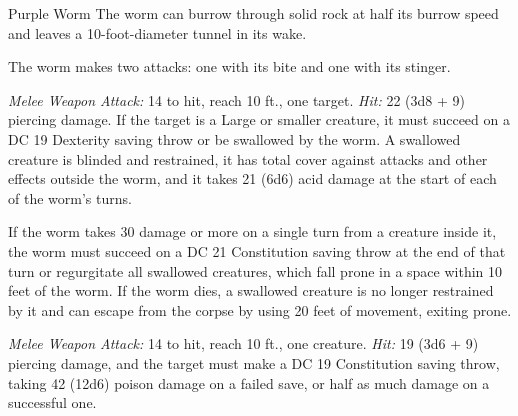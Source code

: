 \documentclass[10pt,a4paper,twoside,bg=print,twocolumn,openany,nodeprecatedcode]{dndbook}
\begin{document}
\begin{DndMonster}[float=t]{Purple Worm}
\DndMonsterBasics[
armor-class = {18 (natural armor)},
hit-points = {\DndDice{15d20 + 90}},
speed = {50 ft., burrow 30 ft.}
]
\DndMonsterAbilityScores[
 str = 28,
 dex = 7,
 con = 22,
 int = 1,
 wis = 8,
 cha = 4
]
\DndMonsterDetails[
saving-throws = {Con +11, Wis +4},
senses = {blindsight 30 ft., tremorsense 60 ft., passive perception 9},
challenge = 15,
]
The worm can burrow through solid rock at half its burrow speed and leaves a 10-foot-diameter tunnel in its wake.

The worm makes two attacks: one with its bite and one with its stinger.

\textsl{Melee Weapon Attack:} 14 to hit, reach 10 ft., one target. \textsl{Hit:} 22 (3d8 + 9) piercing damage. If the target is a Large or smaller creature, it must succeed on a DC 19 Dexterity saving throw or be swallowed by the worm. A swallowed creature is blinded and restrained, it has total cover against attacks and other effects outside the worm, and it takes 21 (6d6) acid damage at the start of each of the worm's turns.

If the worm takes 30 damage or more on a single turn from a creature inside it, the worm must succeed on a DC 21 Constitution saving throw at the end of that turn or regurgitate all swallowed creatures, which fall prone in a space within 10 feet of the worm. If the worm dies, a swallowed creature is no longer restrained by it and can escape from the corpse by using 20 feet of movement, exiting prone.

\textsl{Melee Weapon Attack:} 14 to hit, reach 10 ft., one creature. \textsl{Hit:} 19 (3d6 + 9) piercing damage, and the target must make a DC 19 Constitution saving throw, taking 42 (12d6) poison damage on a failed save, or half as much damage on a successful one.

\end{DndMonster}


\clearpage
\end{document}
